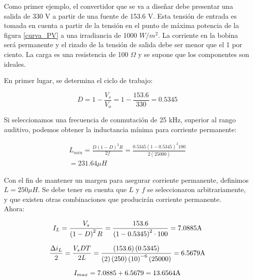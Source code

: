 \documentclass[10pt,twocolumn]{article}
\begin{document}
Como primer ejemplo, el convertidor que se va a diseñar debe presentar una salida de 330 V a partir de una fuente de 153.6 V. Esta tensión de entrada es tomada en cuenta a partir de la tensión en el punto de máxima potencia de la figura \ref{curva_PV} a una irradiancia de 1000 $W/m^2$. La corriente en la bobina será permanente y el rizado de la tensión de salida debe ser menor que el 1 por ciento. La carga es una resistencia de 100 $\Omega$ y se supone que los componentes son ideales.

En primer lugar, se determina el ciclo de trabajo:

\begin{equation*}
	D = 1 - \frac{V_s}{V_o} = 1 - \frac{153.6}{330} = 0.5345
\end{equation*}

Si seleccionamos una frecuencia de conmutación de 25 kHz, superior al rango auditivo, podemos obtener la inductancia mínima para corriente permanente:

\begin{equation*}
	\begin{matrix}
		L_{min} = \frac{D\left ( 1- D \right )^2 R}{2f} = \frac{0.5345 \left ( 1 - 0.5345 \right )^2 100}{2\left ( 25000 \right )} \\
		= 231.64 \mu H
	\end{matrix}
\end{equation*}

Con el fin de mantener un margen para asegurar corriente permanente, definimos $L = 250 \mu H$. Se debe tener en cuenta que $L$ y $f$ se seleccionaron arbitrariamente, y que existen otras combinaciones que producirán corriente permanente.\\

Ahora:

\begin{equation*}
	I_L = \dfrac{V_s}{\left ( 1-D \right )^2 R} = \dfrac{153.6}{\left ( 1-0.5345 \right )^2\cdot 100} = 7.0885 \textup{A}
\end{equation*}

\begin{equation*}
	\dfrac{\Delta i_L}{2} = \dfrac{V_s DT}{2L} = \dfrac{\left ( 153.6 \right )\left ( 0.5345 \right )}{\left ( 2 \right )\left ( 250 \right )\left ( 10 \right )^{-6}\left ( 25000 \right )} = 6.5679 \textup{A}
\end{equation*}

\begin{equation*}
	I_{max} = 7.0885 + 6.5679 = 13.6564 \textup{A}
\end{equation*}
\end{document}
